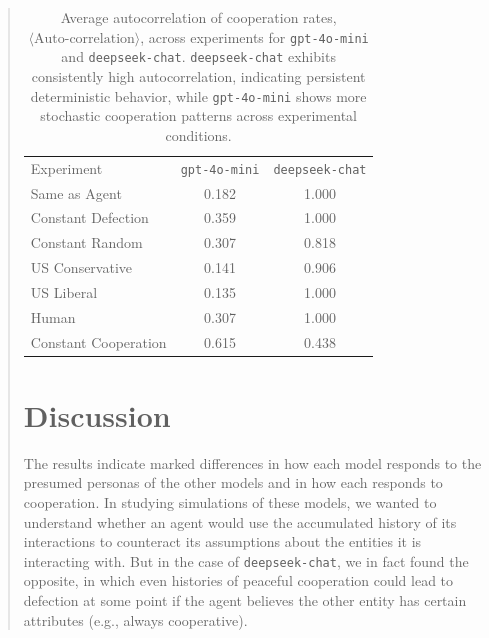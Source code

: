 \documentclass[%
 reprint,
 amsmath,amssymb,
 aps,
]{revtex4-2}
\begin{document}
\begin{abstract}
\begin{table}[t]
\begin{ruledtabular}
\begin{tabular}{lcc}
\textrm{Experiment} & \texttt{gpt-4o-mini} & \texttt{deepseek-chat} \\
\colrule
Same as Agent        & 0.182 & 1.000 \\
Constant Defection   & 0.359 & 1.000 \\
Constant Random      & 0.307 & 0.818 \\
US Conservative      & 0.141 & 0.906 \\
US Liberal           & 0.135 & 1.000 \\
Human                & 0.307 & 1.000 \\
Constant Cooperation & 0.615 & 0.438 \\
\end{tabular}
\end{ruledtabular}
\caption{\label{tab:autocorr_comparison} Average autocorrelation of cooperation rates,  $\langle \text{Auto-correlation}\rangle$,  
across experiments for \texttt{gpt-4o-mini} and \texttt{deepseek-chat}.  \texttt{deepseek-chat} exhibits consistently high autocorrelation, indicating persistent deterministic behavior, while \texttt{gpt-4o-mini} shows more stochastic cooperation patterns across experimental conditions.}
\end{table}
\section{Discussion}

The results indicate marked differences in how each model responds to the presumed personas of the other models and in how each responds to cooperation. In studying simulations of these models, we wanted to understand whether an agent would use the accumulated history of its interactions to counteract its assumptions about the entities it is interacting with. But in the case of  \texttt{deepseek-chat}, we in fact found the opposite, in which even histories of peaceful cooperation could lead to defection at some point if the agent believes the other entity has certain attributes (e.g., always cooperative).


\end{abstract}
\end{document}
